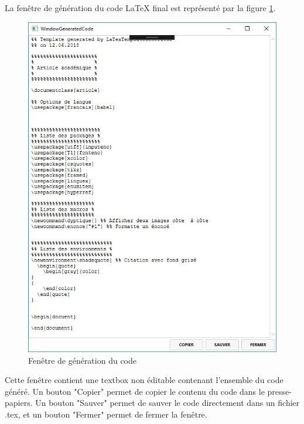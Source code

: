 \documentclass[a4paper, oneside]{article}
\begin{document}
La fenêtre de génération du code \LaTeX{} final est représenté par la figure \ref{fig:org1d1fae8}.
\begin{figure}[htbp]
\centering
\includegraphics[width=.9\linewidth]{../Images/code.jpg}
\caption{\label{fig:org1d1fae8}
Fenêtre de génération du code}
\end{figure}

Cette fenêtre contient une textbox non éditable contenant l'ensemble du code
généré. Un bouton "Copier" permet de copier le contenu du code dans le
presse-papiers. Un bouton "Sauver" permet de sauver le code directement dans un
fichier .tex, et un bouton "Fermer" permet de fermer la fenêtre.
\end{document}
